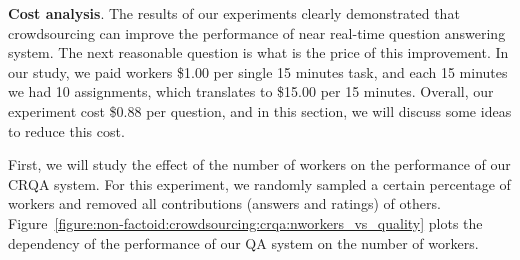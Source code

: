 \textbf{Cost analysis}.
The results of our experiments clearly demonstrated that crowdsourcing can improve the performance of near real-time question answering system.
The next reasonable question is what is the price of this improvement.
In our study, we paid workers \$1.00 per single 15 minutes task, and each 15 minutes we had 10 assignments, which translates to \$15.00 per 15 minutes.
Overall, our experiment cost \$0.88 per question, and in this section, we will discuss some ideas to reduce this cost.

First, we will study the effect of the number of workers on the performance of our CRQA system.
For this experiment, we randomly sampled a certain percentage of workers and removed all contributions (answers and ratings) of others.
Figure~\ref{figure:non-factoid:crowdsourcing:crqa:nworkers_vs_quality} plots the dependency of the performance of our QA system on the number of workers.

